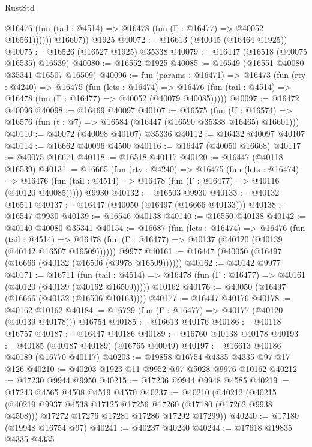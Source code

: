 \begin{lexlean}{RustStd}
\begin{coremodule}
{\begin{coremodule}
{{{{{{{{{{{{{{{{{{{{{{{{{{{{{{{{{{{{{{{{{{{{{{{{{{{{{{{              @16476 (fun (tail : @4514) => @16478 (fun (Γ : @16477) => @40052 @16561))))))
        @16607))
    @1925
@40072 := @16613 (@40045 (@16464 @1925))
@40075 := @16526 (@16527 @1925) @35338
@40079 := @16447 (@16518 (@40075 @16535) @16539)
@40080 := @16552 @1925
@40085 := @16549 (@16551 @40080 @35341 @16507 @16509)
@40096 := fun (params : @16471) =>
  @16473
    (fun (rty : @4240) =>
    @16475
      (fun (lets : @16474) =>
      @16476 (fun (tail : @4514) => @16478 (fun (Γ : @16477) => @40052 (@40079 @40085)))))
@40097 := @16472 @40096
@40098 := @16469 @40097
@40107 := @16575
    (fun (U : @16574) => @16576 (fun (t : @7) => @16584 (@16447 (@16590 @35338 @16465) @16601)))
@40110 := @40072 (@40098 @40107) @35336
@40112 := @16432 @40097 @40107
@40114 := @16662 @40096 @4500
@40116 := @16447 (@40050 @16668)
@40117 := @40075 @16671
@40118 := @16518 @40117
@40120 := @16447 (@40118 @16539)
@40131 := @16665
    (fun (rty : @4240) =>
    @16475
      (fun (lets : @16474) =>
      @16476 (fun (tail : @4514) => @16478 (fun (Γ : @16477) => @40116 (@40120 @40085)))))
    @9930
@40132 := @16503 @9930
@40133 := @40132 @16511
@40137 := @16447 (@40050 (@16497 (@16666 @40133)))
@40138 := @16547 @9930
@40139 := @16546 @40138
@40140 := @16550 @40138
@40142 := @40140 @40080 @35341
@40154 := @16687
    (fun (lets : @16474) =>
    @16476
      (fun (tail : @4514) =>
      @16478 (fun (Γ : @16477) => @40137 (@40120 (@40139 (@40142 @16507 @16509))))))
    @9977
@40161 := @16447 (@40050 (@16497 (@16666 (@40132 (@16506 (@9978 @16509))))))
@40162 := @40142 @9977
@40171 := @16711
    (fun (tail : @4514) => @16478 (fun (Γ : @16477) => @40161 (@40120 (@40139 (@40162 @16509)))))
    @10162
@40176 := @40050 (@16497 (@16666 (@40132 (@16506 @10163))))
@40177 := @16447 @40176
@40178 := @40162 @10162
@40184 := @16729 (fun (Γ : @16477) => @40177 (@40120 (@40139 @40178))) @16754
@40185 := @16613 @40176
@40186 := @40118 @16757
@40187 := @16447 @40186
@40189 := @16760 @40138 @40178
@40193 := @40185 (@40187 @40189) (@16765 @40049)
@40197 := @16613 @40186 @40189 (@16770 @40117)
@40203 := @19858 @16754 @4335 @4335 @97 @17 @126
@40210 := @40203 @1923 @11 @9952 @97 @5028 @9976 @10162
@40212 := @17230 @9944 @9950
@40215 := @17236 @9944 @9948 @4585
@40219 := @17243 @4565 @4508 @4519 @4570
@40237 := @40210
    (@40212
      (@40215
        (@40219 @9937 @4538 @17125 @17256 @17260 (@17180 (@17262 @9938 @4508)))
        @17272
        @17276
        @17281
        @17286
        @17292
        @17299))
@40240 := @17180 (@19948 @16754 @97)
@40241 := @40237 @40240
@40244 := @17618 @19835 @4335 @4335
}}}}}}}}}}}}}}}}}}}}}}}}}}}}}}}}}}}}}}}}}}}}}}}}}}}}}}}
\end{coremodule}}
\end{coremodule}
\end{lexlean}
